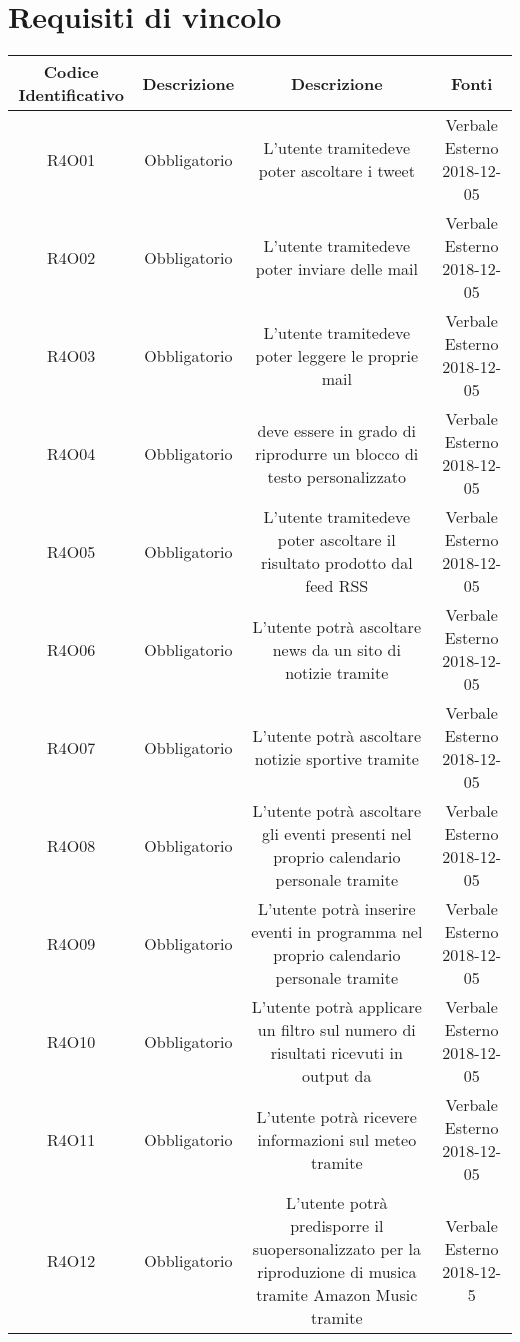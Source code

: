 \section{Requisiti di vincolo}
\begin{tabularx}{\textwidth}{|C|C|C|C|}
	\hline
	\textbf{Codice Identificativo}& \textbf{Descrizione} & \textbf{Descrizione} & \textbf{Fonti}\\
	\hline	
	\endhead
	R4O01&Obbligatorio  &L'utente tramitedeve poter ascoltare i tweet & Verbale Esterno 2018-12-05 \\
	\hline
	R4O02&Obbligatorio  &L'utente tramitedeve poter inviare delle mail & Verbale Esterno 2018-12-05 \\
	\hline
	R4O03&Obbligatorio  &L'utente tramitedeve poter leggere le proprie mail & Verbale Esterno 2018-12-05 \\
	\hline
	R4O04&Obbligatorio  & deve essere in grado di riprodurre un blocco di testo personalizzato & Verbale Esterno 2018-12-05 \\
	\hline
	R4O05&Obbligatorio  &L'utente tramitedeve poter ascoltare il risultato prodotto dal feed RSS & Verbale Esterno 2018-12-05 \\
	\hline
	R4O06 &Obbligatorio& L'utente potrà ascoltare news da un sito di notizie tramite &Verbale Esterno 2018-12-05\\
	\hline
	R4O07 &Obbligatorio& L'utente potrà ascoltare notizie sportive tramite &Verbale Esterno 2018-12-05\\
	\hline
	R4O08 &Obbligatorio&L'utente potrà ascoltare gli eventi presenti nel proprio calendario personale tramite  &Verbale Esterno 2018-12-05\\
	\hline
	R4O09 &Obbligatorio& L'utente potrà inserire eventi in programma nel proprio calendario personale  tramite& Verbale Esterno 2018-12-05\\
	\hline
	R4O10 &Obbligatorio &L'utente potrà applicare un filtro sul numero di risultati ricevuti in output da &Verbale Esterno 2018-12-05\\
	\hline
	R4O11 &Obbligatorio &L'utente potrà ricevere informazioni sul meteo tramite & Verbale Esterno 2018-12-05\\
	\hline
	R4O12&Obbligatorio&L'utente potrà predisporre il suopersonalizzato per la riproduzione di musica tramite Amazon Music tramite& Verbale Esterno 2018-12-5 \\

\end{tabularx}
